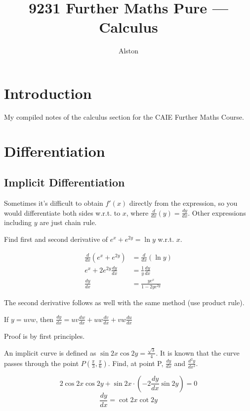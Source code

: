 \documentclass{article}
\title{9231 Further Maths Pure — Calculus}
\author{Alston}
\date{}
\newcommand{\f}[2]{\frac{#1}{#2}}
\theoremstyle{mytheoremstyle}
\theoremstyle{mytheoremstyle}
\theoremstyle{myproblemstyle}
\theoremstyle{myproblemstyle}
\begin{document}
    \maketitle
    \section{Introduction}
    My compiled notes of the calculus section for the CAIE Further Maths Course.

    \section{Differentiation}
    \subsection{Implicit Differentiation}
    Sometimes it's difficult to obtain $f'(x)$ directly from the expression, so you would differentiate both sides w.r.t. to $x$, where $\frac{d}{dx}(y) = \frac{dy}{dx}$. Other expressions including $y$ are just chain rule.

    \begin{example}
        Find first and second derivative of $e^x + e^{2y} = \ln{y}$ w.r.t. $x$.
    \end{example}

    \begin{align*}
    \f{d}{dx}(e^x + e^{2y}) &= \f{d}{dx}(\ln{y})\\
    e^x + 2e^{2y}\f{dy}{dx} &= \f{1}{y} \frac{dy}{dx}\\
    \frac{dy}{dx} &= \f{ye^x}{1-2ye^{2y}}
    \end{align*}
    

    The second derivative follows as well with the same method (use product rule).
    \begin{theorem}
        If $y = uvw$, then $\frac{dy}{dx} = uv\frac{dw}{dx} + uw\frac{dv}{dx} + vw\frac{du}{dx}$
    \end{theorem}

    Proof is by first principles.

    \begin{example}
        An implicit curve is defined as $\sin{2x}\cos{2y} = \f{\sqrt{3}}{4}$. It is known that the curve passes through the point $P(\f{\pi}{3}, \f{\pi}{6})$. Find, at point P, $\f{dy}{dx}$ and $\f{d^2y}{dx^2}$.
    \end{example}


    \[2\cos{2x}\cos{2y} + \sin{2x}\cdot(-2\f{dy}{dx}\sin{2y}) = 0\]
    \[\f{dy}{dx} = \cot{2x}\cot{2y}\]
\end{document}
